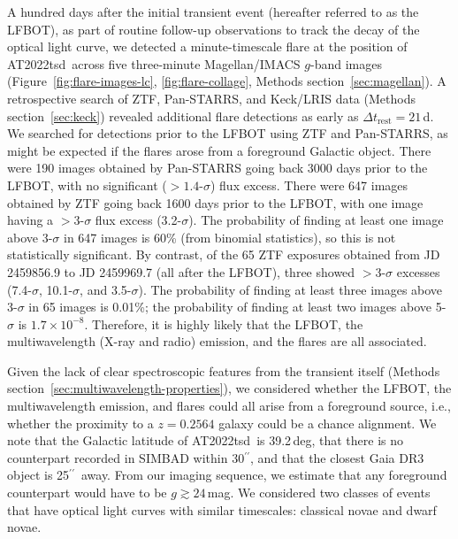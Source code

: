 \documentclass{nature_plusfigure}
\newcommand{\at}{AT2022tsd}
\newcommand{\arcsec}{$^{\prime\prime}$}
\begin{document}
\begin{methods}
A hundred days after the initial transient event (hereafter referred to as the LFBOT), as part of routine follow-up observations to track the decay of the optical light curve, we detected\cite{Ho2022_Flares} a minute-timescale flare at the position of \at\ across five three-minute Magellan/IMACS $g$-band images (Figure~\ref{fig:flare-images-lc}, \ref{fig:flare-collage}, Methods section~\ref{sec:magellan}). A retrospective search of ZTF, Pan-STARRS, and Keck/LRIS data (Methods section~\ref{sec:keck}) revealed additional flare detections as early as $\Delta t_\mathrm{rest}=21\,$d. We searched for detections prior to the LFBOT using ZTF and Pan-STARRS, as might be expected if the flares arose from a foreground Galactic object. There were 190 images obtained by Pan-STARRS going back 3000 days prior to the LFBOT, with no significant ($>1.4$-$\sigma$) flux excess\cite{Fulton2022}. There were 647 images obtained by ZTF going back 1600 days prior to the LFBOT, with one image having a $>3$-$\sigma$ flux excess (3.2-$\sigma$). The probability of finding at least one image above 3-$\sigma$ in 647 images is 60\% (from binomial statistics), so this is not statistically significant. By contrast, of the 65 ZTF exposures obtained from JD 2459856.9 to JD 2459969.7 (all after the LFBOT), three showed $>3$-$\sigma$ excesses (7.4-$\sigma$, 10.1-$\sigma$, and 3.5-$\sigma$). The probability of finding at least three images above 3-$\sigma$ in 65 images is 0.01\%; the probability of finding at least two images above 5-$\sigma$ is $1.7\times10^{-8}$. Therefore, it is highly likely that the LFBOT, the multiwavelength (X-ray and radio) emission, and the flares are all associated. 


Given the lack of clear spectroscopic features from the transient itself (Methods section~\ref{sec:multiwavelength-properties}), we considered whether the LFBOT, the multiwavelength emission, and flares could all arise from a foreground source, i.e., whether the proximity to a $z=0.2564$ galaxy could be a chance alignment. 
We note that the Galactic latitude of \at\ is 39.2\,deg, that there is no counterpart recorded in SIMBAD within 30\arcsec, and that the closest Gaia DR3 object is 25\arcsec\ away. From our imaging sequence, we estimate that any foreground counterpart would have to be $g \gtrsim 24\,$mag. We considered two classes of events that have optical light curves with similar timescales: classical novae and dwarf novae.


\end{methods}
\end{document}
